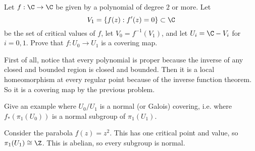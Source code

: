 \documentclass[11pt,letterpaper]{article}
\begin{document}
\begin{problem}
    Let $f : \C \to \C$ be given by a polynomial of degree $2$ or more. Let
    \[
        V_1 = \{f(z) : f'(z) = 0\}\subset \C
    \] 
    be the set of critical values of $f$, let $V_0 = f^{-1}(V_1)$, and let $U_i = \C - V_i$ for $i=0,1$. Prove that $f: U_0 \to U_1$ is a covering map.
\end{problem}

\begin{solution}
    \quad First of all, notice that every polynomial is proper because the inverse of any closed and bounded region is closed and bounded. Then it is a local homeomorphism at every regular point because of the inverse function theorem. So it is a covering map by the previous problem.
\end{solution}

\begin{problem}
    Give an example where $U_0 / U_1$ is a normal (or Galois) covering, i.e. where $f_*(\pi_1(U_0))$ is a normal subgroup of $\pi_1(U_1)$.
\end{problem}

\begin{solution}
    \quad Consider the parabola $f(z) = z^2$. This has one critical point and value, so $\pi_1(U_1)\cong \Z$. This is abelian, so every subgroup is normal. 
\end{solution}
\end{document}
